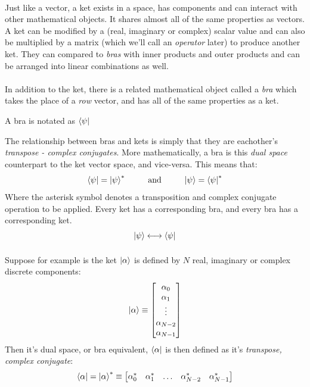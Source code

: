 \documentclass[12pt,letterpaper]{book}
\begin{document}
\paragraph*{}Just like a vector, a ket exists in a space, has components and can interact with other mathematical objects. It shares almost all of the same properties as vectors. A ket can be modified by a (real, imaginary or complex) scalar value and can also be multiplied by a matrix (which we'll call an \textit{operator} later) to produce another ket. They can compared to \textit{bras} with inner products and outer products and can be arranged into linear combinations as well.
\paragraph*{}In addition to the ket, there is a related mathematical object called a \textit{bra} which takes the place of a \textit{row} vector, and has all of the same properties as a ket.
\begin{center}
A bra is notated as $\bra{\psi}$
\end{center}
The relationship between bras and kets is simply that they are eachother's \textit{transpose - complex conjugates}. More mathematically, a bra is this \textit{dual space} counterpart to the ket vector space, and vice-versa. This means that:
\begin{equation}
\label{bra-ket relation}
\bra{\psi} = \ket{\psi}^* 
\text{\hspace*{8mm} and \hspace*{8mm}} 
\ket{\psi} = \bra{\psi}^*
\end{equation}
Where the asterisk symbol denotes a transposition and complex conjugate operation to be applied. Every ket has a corresponding bra, and every bra has a corresponding ket.
\begin{equation}
\ket{\psi} \longleftrightarrow \bra{\psi}
\end{equation}

\paragraph*{}Suppose for example is the ket $\ket{\alpha}$ is defined by $N$ real, imaginary or complex discrete components:
\begin{equation}
\label{discrete ket}
\ket{\alpha} \equiv
\begin{bmatrix}
\alpha_0 \\ \alpha_1 \\ \vdots \\ \alpha_{N-2} \\ \alpha_{N-1}
\end{bmatrix}
\end{equation}
Then it's dual space, or bra equivalent, $\bra{\alpha}$ is then defined as it's  \textit{transpose, complex conjugate}:
\begin{equation}
\label{discrete bra}
\bra{\alpha} = 
\ket{\alpha}^* \equiv
\begin{bmatrix}
\alpha^*_0 & \alpha^*_1 & \hdots &\alpha^*_{N-2} & \alpha^*_{N-1}
\end{bmatrix}
\end{equation}
\end{document}
